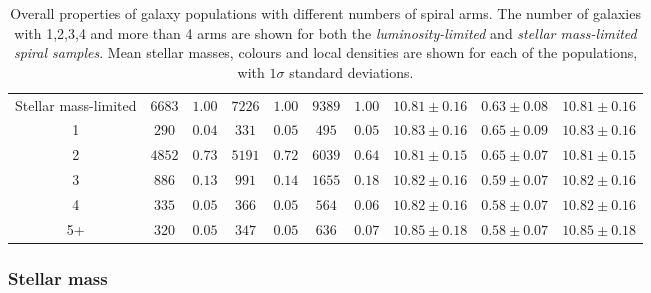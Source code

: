 \documentclass[useAMS,usenatbib]{mn2e}
\begin{document}
\begin{table}
\begin{tabular}{cccccccccc}
 Stellar mass-limited & $6683$    & $1.00$    & $7226$    & $1.00$    & $9389$         & $1.00$         & $10.81\pm 0.16$                    & $0.63\pm 0.08$ & $10.81\pm 0.16$              \\
 1                    & $290$     & $0.04$    & $331$     & $0.05$    & $495$          & $0.05$         & $10.83\pm 0.16$                    & $0.65\pm 0.09$ & $10.83\pm 0.16$              \\
 2                    & $4852$    & $0.73$    & $5191$    & $0.72$    & $6039$         & $0.64$         & $10.81\pm 0.15$                    & $0.65\pm 0.07$ & $10.81\pm 0.15$              \\
 3                    & $886$     & $0.13$    & $991$     & $0.14$    & $1655$         & $0.18$         & $10.82\pm 0.16$                    & $0.59\pm 0.07$ & $10.82\pm 0.16$              \\
 4                    & $335$     & $0.05$    & $366$     & $0.05$    & $564$          & $0.06$         & $10.82\pm 0.16$                    & $0.58\pm 0.07$ & $10.82\pm 0.16$              \\
 5+                   & $320$     & $0.05$    & $347$     & $0.05$    & $636$          & $0.07$         & $10.85\pm 0.18$                    & $0.58\pm 0.07$ & $10.85\pm 0.18$              \\
\hline
\end{tabular}



\caption{Overall properties of galaxy populations with different numbers of spiral arms. The number of galaxies with 1,2,3,4 and more than 4 arms are shown for both the \textit{luminosity-limited} and \textit{stellar mass-limited spiral samples}. Mean stellar masses, colours and local densities are shown for each of the populations, with $1\sigma$ standard deviations.}

\label{table:overall_property_table}

\end{table}

\subsubsection{Stellar mass}
\label{sec:mass}
\end{document}

